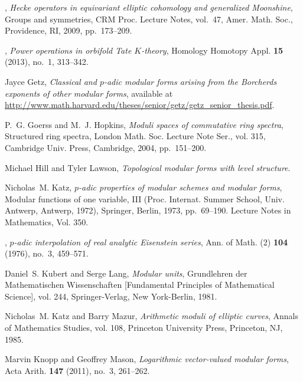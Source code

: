 \documentclass{gtpart}
\theoremstyle{definition}
\theoremstyle{remark}
\renewcommand{\=}{\approx}
\renewcommand{\-}{\sim}
\numberwithin{equation}{section}
\numberwithin{thm}{section}
\begin{document}
\begin{thebibliography}
\bysame, \emph{Hecke operators in equivariant elliptic cohomology and
  generalized {M}oonshine}, Groups and symmetries, CRM Proc. Lecture Notes,
  vol.~47, Amer. Math. Soc., Providence, RI, 2009, pp.~173--209. 

\bysame, \emph{Power operations in orbifold {T}ate {$K$}-theory}, Homology
  Homotopy Appl. \textbf{15} (2013), no.~1, 313--342. 

Jayce Getz, \emph{Classical and {$p$}-adic modular forms arising from the
  {B}orcherds exponents of other modular forms}, 
  available at \href{http://www.math.harvard.edu/theses/senior/getz/getz_senior_thesis.pdf}{http://www.math.harvard.edu/theses/senior/getz\linebreak/getz\_senior\_thesis.pdf}.

P.~G. Goerss and M.~J. Hopkins, \emph{Moduli spaces of commutative ring
  spectra}, Structured ring spectra, London Math. Soc. Lecture Note Ser., vol.
  315, Cambridge Univ. Press, Cambridge, 2004, pp.~151--200. 

Michael Hill and Tyler Lawson, \emph{Topological modular forms with level
  structure}. 

Nicholas~M. Katz, \emph{{$p$}-adic properties of modular schemes and modular
  forms}, Modular functions of one variable, {III} ({P}roc. {I}nternat.
  {S}ummer {S}chool, {U}niv. {A}ntwerp, {A}ntwerp, 1972), Springer, Berlin,
  1973, pp.~69--190. Lecture Notes in Mathematics, Vol. 350. 

\bysame, \emph{{$p$}-adic interpolation of real analytic {E}isenstein series},
  Ann. of Math. (2) \textbf{104} (1976), no.~3, 459--571. 

Daniel~S. Kubert and Serge Lang, \emph{Modular units}, Grundlehren der
  Mathematischen Wissenschaften [Fundamental Principles of Mathematical
  Science], vol. 244, Springer-Verlag, New York-Berlin, 1981. 

Nicholas~M. Katz and Barry Mazur, \emph{Arithmetic moduli of elliptic curves},
  Annals of Mathematics Studies, vol. 108, Princeton University Press,
  Princeton, NJ, 1985. 

Marvin Knopp and Geoffrey Mason, \emph{Logarithmic vector-valued modular
  forms}, Acta Arith. \textbf{147} (2011), no.~3, 261--262. 


\end{thebibliography}
\end{document}
